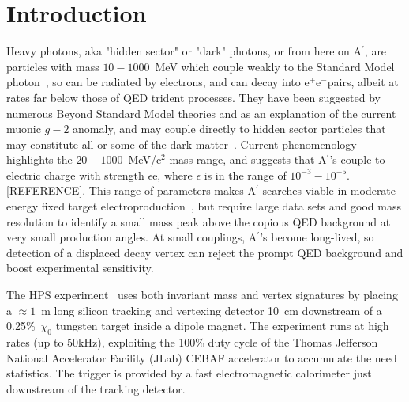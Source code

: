 \documentclass[final,3p,times,twocolumn]{elsarticle}
\newcommand{\Aprime}{A\ensuremath{^\prime}}
\newcommand{\ee}{e$^+$e$^-$}
\begin{document}
\section{Introduction}
\label{introduction}
Heavy photons, aka "hidden sector" or "dark" photons, or from here on \Aprime{}, are particles with 
mass $10-1000$~MeV 
which couple weakly to the Standard Model photon~\cite{Holdom:1985ag}, so can be radiated by 
electrons, and can decay 
into \ee pairs, albeit at rates far below those of QED trident processes. They have been suggested by 
numerous Beyond Standard Model theories and as an explanation of the current muonic $g-2$ 
anomaly, and may couple directly to hidden sector particles that may constitute all or some of the 
dark matter~\cite{ArkaniHamed:2008qn}. 
Current phenomenology highlights the $20-1000$~MeV/c$^{2}$ mass range, and 
suggests that \Aprime's couple to electric charge with strength $\epsilon$e, where 
$\epsilon$ is in the range of $10^{-3} -10^{-5}$. [REFERENCE]. This range of parameters makes 
\Aprime{} searches viable in moderate energy fixed target 
electroproduction~\cite{Bjorken:2009mm}, but require large data sets and good mass resolution
to identify a small mass peak above the copious QED background at very small production 
angles. At small couplings, \Aprime's become long-lived, so detection of a displaced decay 
vertex can reject the prompt QED background and boost experimental sensitivity.  

The HPS experiment~\cite{HPS_proposal_2010} uses both invariant mass and 
vertex signatures by placing a $\approx 1$~m long silicon tracking and vertexing detector 10~cm 
downstream  of a 0.25\%~$\chi_0$ tungsten target inside a dipole magnet. The experiment runs at high 
rates (up to 50kHz), exploiting the 
100\% duty cycle of the Thomas Jefferson National Accelerator Facility (JLab) CEBAF accelerator to 
accumulate the need statistics. The trigger is provided by a fast electromagnetic calorimeter just 
downstream of the tracking detector. 
\end{document}
